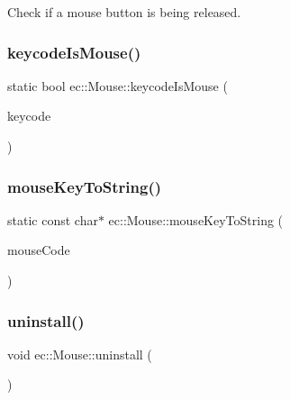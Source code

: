 Check if a mouse button is being released. \mbox{\label{classec_1_1_mouse_a6c43132b82c3d730515c3f6c8cf9e142}} 
\subsubsection{\texorpdfstring{keycode\+Is\+Mouse()}{keycodeIsMouse()}}
{\footnotesize\ttfamily static bool ec\+::\+Mouse\+::keycode\+Is\+Mouse (\begin{DoxyParamCaption}\item[{int}]{keycode }\end{DoxyParamCaption})\hspace{0.3cm}{\ttfamily [static]}}

\mbox{\label{classec_1_1_mouse_a8ea44f894f0467851d1a12747f8a5e4b}} 
\subsubsection{\texorpdfstring{mouse\+Key\+To\+String()}{mouseKeyToString()}}
{\footnotesize\ttfamily static const char$\ast$ ec\+::\+Mouse\+::mouse\+Key\+To\+String (\begin{DoxyParamCaption}\item[{\mbox{\hyperlink{classec_1_1_mouse_acabdd3509adc381e415c60b29554e2fb}{E\+C\+\_\+\+K\+E\+Y\+\_\+\+M\+O\+U\+SE}}}]{mouse\+Code }\end{DoxyParamCaption})\hspace{0.3cm}{\ttfamily [static]}}

\mbox{\label{classec_1_1_mouse_afee0caa17130a35f9b94523776a6fffb}} 
\subsubsection{\texorpdfstring{uninstall()}{uninstall()}}
{\footnotesize\ttfamily void ec\+::\+Mouse\+::uninstall (\begin{DoxyParamCaption}{ }\end{DoxyParamCaption})}

